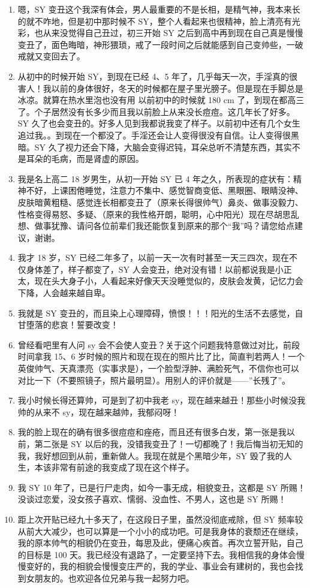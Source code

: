 \documentclass[fontset=founder]{ctexart}
\begin{document}
\begin{enumerate}
    \item 嗯，SY 变丑这个我深有体会，男人最重要的不是长相，是精气神，我本来长的就不咋地，但是初中那时候不 SY，整个人看起来也很精神，脸上清亮有光彩，也从来没觉得自己丑过，初三开始 SY 之后到高中再到现在自己真是慢慢变丑了，面色晦暗，神形猥琐，戒了一段时间之后就能感到自己变帅些，一破戒就又变回去了。
    \item 从初中的时候开始 SY，到现在已经 4、5 年了，几乎每天一次，手淫真的很害人！我以前的身体很好，冬天的时候都在屋子里光膀子。但是现在手脚总是冰凉。就算在热水里泡也没有用 以前初中的时候就 180 cm 了，到现在都高三了。个子居然没有长多少而且我以前脸上从来没长痘痘。这几年长了好多。SY 久了也会变丑的。好多人见到我都说我变了样子。以前初中还有几个女生追过我。。到现在一个都没了。手淫还会让人变得很没有自信。让人变得很黑暗。SY 久了视力还会下降，大脑会变得迟钝，耳朵总听不清楚东西，其实不是耳朵的毛病，而是肾虚的原因。
    \item 我是名上高二 18 岁男生，从初一开始 SY 已 4 年之久，所表现的症状有：精神不好，上课困倦睡觉，注意力不集中、感觉智商变低、黑眼圈、眼睛没神、皮肤暗黄粗糙、感觉连长相都变丑了（原来长得很帅气）鼻炎、做事没毅力、性格变得易怒、多疑、（原来的我性格开朗，聪明，心中阳光）现在尽胡思乱想、做事犹豫、请问各位前辈们我还能恢复到原来的那个“我”吗？请您给点建议，谢谢。
    \item 我才 18 岁，SY 已经二年多了，以前一天一次有时甚至一天三四次，现在不仅身体差了，样子都变了，SY 人会变丑，绝对没有错！以前都说我是小正太，现在头大身子小，人看起来好像天天没睡觉似的，皮肤会发黄，记忆力会下降，人会越来越自卑。
    \item 我就是 SY 变丑的，而且染上心理障碍，愤恨！！！阳光的生活不去感觉，自甘堕落的悲哀！誓要改变！
    \item 曾经看吧里有人问 sy 会不会使人变丑？关于这个问题我特意做过对比，前段时间拿我 15、6 岁时候的照片和现在现在的照片比了比，简直判若两人！一个英俊帅气、天真漂亮（实事求是），一个脸型浮肿、满脸死气，不信你也可以对比一下（不要照镜子，照片最明显）。用别人的评价就是——”长残了”。
    \item 我小时候长得还算帅，可是到了初中我老 sy，现在越来越丑！那些小时候没我帅的从来不 sy，现在越来越帅，我郁闷呀！
    \item 我的脸上现在的确有很多很痘痘和痤疮，而且还有很多白发，第一张是我以前，第二张是 SY 以后的我，没错我变丑了！一切都晚了！我后悔当初无知的我，我好想回到从前，重新做人。我现在就是个黑暗少年，SY 毁了我的人生，本该非常有前途的我变成了现在这个样子。
    \item 我 SY 10 年了，已是行尸走肉，如今一事无成，相貌变丑，这都是 SY 所赐！没谈过恋爱，没女孩子喜欢、懦弱、没血性、不男人，这也是 SY 所赐！
    \item 距上次开贴已经九十多天了，在这段日子里，虽然没彻底戒除，但 SY 频率较从前大大减少，也可以算是一个小小的成功吧。可是我身体的衰颓还在继续，我的原本帅气的相貌仍在变丑，每思及此，便痛心疾首。再次立誓开贴，自己的目标是 100 天。我已经没有退路了，一定要坚持下去。我相信我的身体会慢慢变好的，我的相貌会慢慢变庄严的，我的学业、事业会有建树的，我也会找到女朋友的。也欢迎各位兄弟与我一起努力吧。
\end{enumerate}
\end{document}
